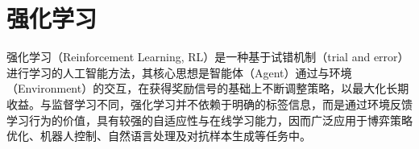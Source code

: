 \section{强化学习}

强化学习（Reinforcement Learning, RL）是一种基于试错机制（trial and error）进行学习的人工智能方法，其核心思想是智能体（Agent）通过与环境（Environment）的交互，在获得奖励信号的基础上不断调整策略，以最大化长期收益。与监督学习不同，强化学习并不依赖于明确的标签信息，而是通过环境反馈学习行为的价值，具有较强的自适应性与在线学习能力，因而广泛应用于博弈策略优化、机器人控制、自然语言处理及对抗样本生成等任务中。



